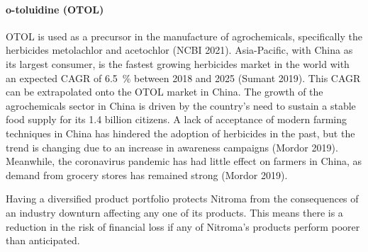 {\paragraph{o-toluidine (OTOL)}
OTOL is used as a precursor in the manufacture of agrochemicals, specifically the herbicides metolachlor and acetochlor (NCBI 2021). Asia-Pacific, with China as its largest consumer, is the fastest growing herbicides market in the world with an expected CAGR of \SI{6.5}{\percent} between 2018 and 2025 (Sumant 2019). This CAGR can be extrapolated onto the OTOL market in China. The growth of the agrochemicals sector in China is driven by the country’s need to sustain a stable food supply for its 1.4 billion citizens. A lack of acceptance of modern farming techniques in China has hindered the adoption of herbicides in the past, but the trend is changing due to an increase in awareness campaigns (Mordor 2019). Meanwhile, the coronavirus pandemic has had little effect on farmers in China, as demand from grocery stores has remained strong (Mordor 2019).

Having a diversified product portfolio protects Nitroma from the consequences of an industry downturn affecting any one of its products. This means there is a reduction in the risk of financial loss if any of Nitroma's products perform poorer than anticipated.

}
